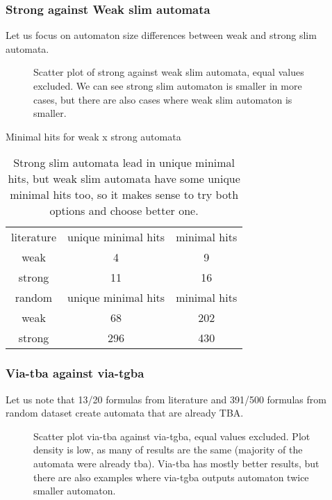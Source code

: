\documentclass[
	digital
nolof, nolot
]{fithesis3}
\begin{document}
	\clearpage
	\subsubsection{Strong against Weak slim automata}
	Let us focus on automaton size differences between weak and strong slim automata.
		\begin{figure}[ht]
			\centering 
			\caption{Scatter plot of strong against weak slim automata, equal values excluded. We can see strong slim automaton is smaller in more cases, but there are also cases where weak slim automaton is smaller.}
		
		\begin{tikzpicture}
			
		\end{tikzpicture}
	\end{figure}
	
		{Minimal hits for weak x strong automata}
		\begin{table}[ht]
			\centering
			\caption{Strong slim automata lead in unique minimal hits, but weak slim automata have some unique minimal hits too, so it makes sense to try both options and choose better one. }
			\begin{tabular}{ |c||c|c| } 
				\hline
				literature&unique minimal hits&minimal hits\\
				\hhline{|===|}
				weak&4 & 9\\
				\hline
				strong&11 & 16\\ 
				\hline
				\hline
				random&unique minimal hits&minimal hits\\
				\hhline{|===|}
				weak&68 & 202\\
				\hline
				strong&296 & 430\\ 
				\hline
			\end{tabular}
		\end{table}

		\clearpage
		\subsubsection{Via-tba against via-tgba}
		Let us note that 13/20 formulas from literature and 391/500 formulas from random dataset create automata that are already TBA.
		
		\begin{figure}[ht]
		\caption{Scatter plot via-tba against via-tgba, equal values excluded. Plot density is low, as many of results are the same (majority of the automata were already tba). Via-tba has mostly better results, but there are also examples where via-tgba outputs automaton twice smaller automaton.}
		\begin{tikzpicture}
			
		\end{tikzpicture}
	\end{figure}
		
\end{document}
